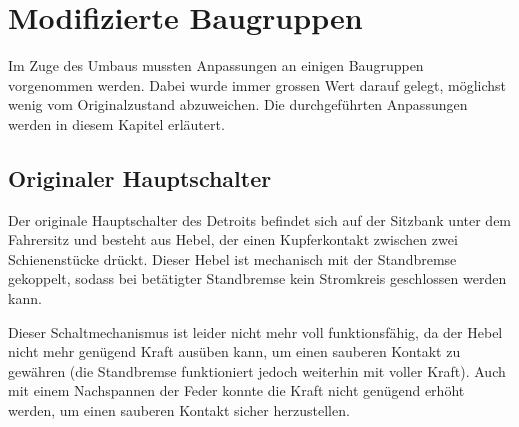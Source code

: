 \section{Modifizierte Baugruppen}

\color{blue}
Im Zuge des Umbaus mussten Anpassungen an einigen Baugruppen vorgenommen werden. Dabei wurde immer grossen Wert darauf gelegt, möglichst wenig vom Originalzustand abzuweichen. Die durchgeführten Anpassungen werden in diesem Kapitel erläutert.

\subsection{Originaler Hauptschalter}
Der originale Hauptschalter des Detroits befindet sich auf der Sitzbank unter dem Fahrersitz und besteht aus Hebel, der einen Kupferkontakt zwischen zwei Schienenstücke drückt. Dieser Hebel ist mechanisch mit der Standbremse gekoppelt, sodass bei betätigter Standbremse kein Stromkreis geschlossen werden kann.

Dieser Schaltmechanismus ist leider nicht mehr voll funktionsfähig, da der Hebel nicht mehr genügend Kraft ausüben kann, um einen sauberen Kontakt zu gewähren (die Standbremse funktioniert jedoch weiterhin mit voller Kraft). Auch mit einem Nachspannen der Feder konnte die Kraft nicht genügend erhöht werden, um einen sauberen Kontakt sicher herzustellen.

